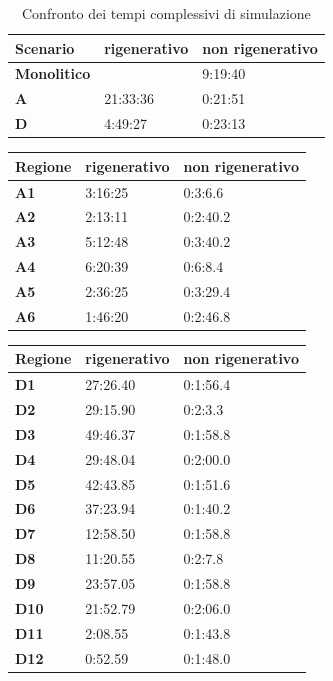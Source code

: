 \begin{table}[h]
  \centering
  \resizebox{0.7\textwidth}{!} {
  \begin{tabular}{ |l|l|l| }
	\hline
\textbf{Scenario}	&		\textbf{rigenerativo}	&		\textbf{non rigenerativo}	\\ \hline
\textbf{Monolitico} &		 						&		9:19:40		\\ \hline
\textbf{A}			 &		21:33:36 				&		0:21:51		\\ \hline
\textbf{D}			 &		4:49:27 				&		0:23:13		\\ \hline

  \end{tabular}
  }
  \caption{Confronto dei tempi complessivi di simulazione}
  \label{tab:tabella-confronto}
\end{table}

\begin{table}[h]
  \centering
  \resizebox{\textwidth}{!} {
  \begin{tabular}{ |l|l|l| }
	\hline
\textbf{Regione}	&		\textbf{rigenerativo}	&		\textbf{non rigenerativo}	\\ \hline
\textbf{A1} 		&		3:16:25					&		0:3:6.6			\\ \hline
\textbf{A2}			 &		2:13:11 				&		0:2:40.2		\\ \hline
\textbf{A3}			 &		5:12:48 				&		0:3:40.2		\\ \hline
\textbf{A4}			 &		6:20:39 				&		0:6:8.4			\\ \hline
\textbf{A5}			 &		2:36:25 				&		0:3:29.4		\\ \hline
\textbf{A6}			 &		1:46:20 				&		0:2:46.8		\\ \hline


  \end{tabular}
  
	\begin{tabular}{ |l|l|l| }
	 	\hline
	\textbf{Regione}	&		\textbf{rigenerativo}	&		\textbf{non rigenerativo}	\\ \hline
	\textbf{D1} 		&		27:26.40				&		0:1:56.4			\\ \hline
	\textbf{D2}		&		29:15.90 				&		0:2:3.3		\\ \hline
	\textbf{D3}		 &		49:46.37 				&		0:1:58.8		\\ \hline
	\textbf{D4}		 &		29:48.04 				&		0:2:00.0			\\ \hline
	\textbf{D5}		 &		42:43.85 				&		0:1:51.6		\\ \hline
	\textbf{D6}		 &		37:23.94 				&		0:1:40.2		\\ \hline
	\textbf{D7}		 &		12:58.50 				&		0:1:58.8		\\ \hline
	\textbf{D8}		 &		11:20.55 				&		0:2:7.8		\\ \hline
	\textbf{D9}		 &		23:57.05 				&		0:1:58.8		\\ \hline
	\textbf{D10}		 &		21:52.79 				&		0:2:06.0		\\ \hline
	\textbf{D11}		 &		2:08.55 				&		0:1:43.8		\\ \hline
	\textbf{D12}		 &		0:52.59 				&		0:1:48.0		\\ \hline
	

\end{tabular}}
\end{table}
